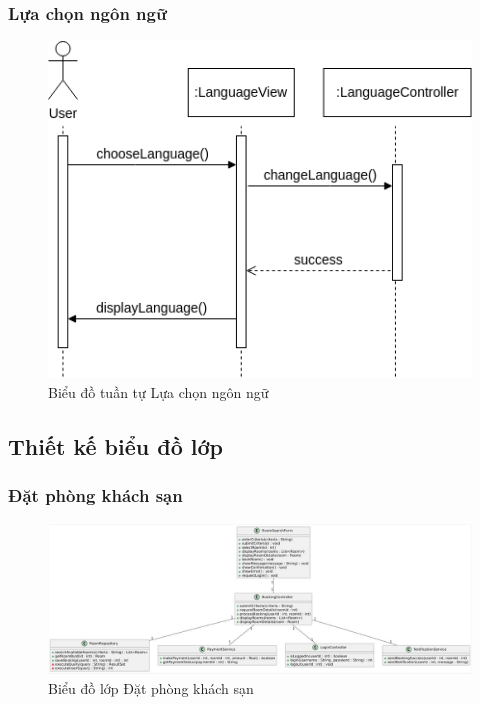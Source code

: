 \subsubsection{Lựa chọn ngôn ngữ}
\begin{figure}[H]
    \centering
    \includegraphics[width=\textwidth]{img3.4/Design_diagram-Chọn ngôn ngữ.drawio.png} 
    \caption{Biểu đồ tuần tự Lựa chọn ngôn ngữ}
\end{figure}

\subsection{Thiết kế biểu đồ lớp}
\subsubsection{Đặt phòng khách sạn}
\begin{figure}[H]
    \centering
    \includegraphics[width=\textwidth]{img3.4.2/thuephong4.jpg} 
    \caption{Biểu đồ lớp Đặt phòng khách sạn}
\end{figure}

